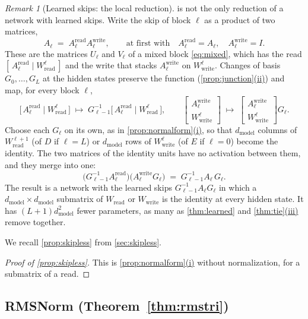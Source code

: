 \documentclass[10pt]{article}
\theoremstyle{definition}
\theoremstyle{remark}
\newtheorem{remark}[theorem]{Remark}
\newcommand{\Wread}{W_{\mathrm{read}}}
\newcommand{\Wwrite}{W_{\mathrm{write}}}
\newcommand{\dm}{d_{\mathrm{model}}}
\DeclareRobustCommand{\cpref}[2]{\hyperref[#1:#2]{\cref*{#1}(#2)}}
\begin{document}
\begin{remark}[Learned skips: the local reduction]\label{rem:locallearned}
 is not the only reduction of a network with learned skips. Write the skip of block $\ell$ as a product of two matrices,
\[
A_\ell \;=\; A^{\mathrm{read}}_\ell A^{\mathrm{write}}_\ell, \qquad\text{at first with}\quad A^{\mathrm{read}}_\ell = A_\ell,\quad A^{\mathrm{write}}_\ell = I .
\]
These are the matrices $U_\ell$ and $V_\ell$ of a mixed block \eqref{eq:mixed}, which has the read $[\,A^{\mathrm{read}}_\ell \mid \Wread^{\ell}\,]$ and the write that stacks $A^{\mathrm{write}}_\ell$ on $\Wwrite^{\ell}$. Changes of basis $G_0, \dots, G_L$ at the hidden states preserve the function (\cpref{prop:junction}{ii}) and map, for every block $\ell$,
\[
\big[\,A^{\mathrm{read}}_\ell \mid \Wread^{\ell}\,\big] \;\mapsto\; G_{\ell-1}^{-1}\big[\,A^{\mathrm{read}}_\ell \mid \Wread^{\ell}\,\big], \qquad
\begin{bmatrix} A^{\mathrm{write}}_\ell \\ \Wwrite^{\ell} \end{bmatrix} \;\mapsto\; \begin{bmatrix} A^{\mathrm{write}}_\ell \\ \Wwrite^{\ell} \end{bmatrix} G_\ell .
\]
Choose each $G_\ell$ on its own, as in \cpref{prop:normalform}{i}, so that $\dm$ columns of $\Wread^{\ell+1}$ (of $D$ if $\ell = L$) or $\dm$ rows of $\Wwrite^{\ell}$ (of $E$ if $\ell = 0$) become the identity. The two matrices of the identity units have no activation between them, and they merge into one:
\[
\big(G_{\ell-1}^{-1}A^{\mathrm{read}}_\ell\big)\big(A^{\mathrm{write}}_\ell G_\ell\big) \;=\; G_{\ell-1}^{-1}A_\ell\,G_\ell .
\]
The result is a network with the learned skips $G_{\ell-1}^{-1}A_\ell G_\ell$ in which a $\dm\times\dm$ submatrix of $\Wread$ or $\Wwrite$ is the identity at every hidden state. It has $(L+1)\dm^2$ fewer parameters, as many as \cref{thm:learned} and \cpref{thm:tie}{iii} remove together.
\end{remark}


We recall \cref{prop:skipless} from \cref{sec:skipless}.
\propSkipless*

\begin{proof}[Proof of \cref{prop:skipless}]
This is \cpref{prop:normalform}{i} without normalization, for a submatrix of a read.
\end{proof}


\subsection{RMSNorm\texorpdfstring{ (Theorem~\ref*{thm:rmstri})}{}}\label{app:prf-rms}
\end{document}
